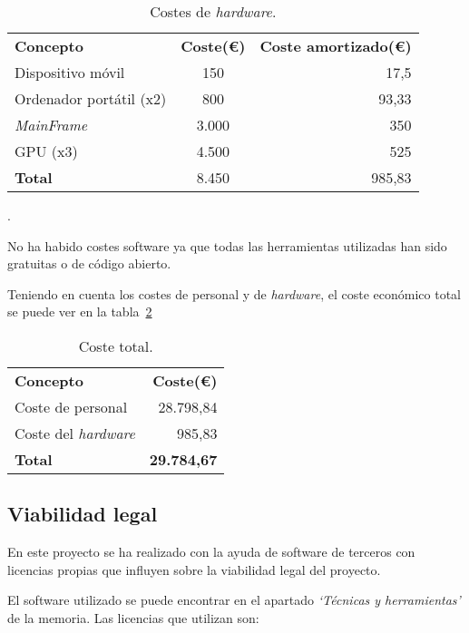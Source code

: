 \begin{table}
	\centering
	\begin{tabular}[]{@{}l c r@{}}
		\toprule
		\textbf{Concepto} & \textbf{Coste(\euro{})} & \textbf{Coste amortizado(\euro{})} \\
		Dispositivo móvil & 150 & 17,5 \\
		Ordenador portátil (x2) & 800 & 93,33 \\
		\textit{MainFrame} & 3.000 & 350 \\ 
		GPU (x3) & 4.500 & 525 \\\hubu
		\textbf{Total} & 8.450 & 985,83
	\end{tabular}
	\caption{Costes de \textit{hardware}.}
	\label{tab:costes_hardware}.
\end{table}

No ha habido costes software ya que todas las herramientas utilizadas han sido gratuitas o de código abierto.

Teniendo en cuenta los costes de personal y de \textit{hardware}, el coste económico total se puede ver en la tabla~\ref{tab:coste_total}

\begin{table}
	\centering
	\begin{tabular}[]{@{}l r@{}}
		\toprule
		\textbf{Concepto} & \textbf{Coste(\euro{})} \\
		Coste de personal & 28.798,84 \\ 
		Coste del \textit{hardware} & 985,83 \\\hubu
		\textbf{Total} & \textbf{29.784,67} \\		
	\end{tabular}
	\caption{Coste total.}
	\label{tab:coste_total}
\end{table}


\subsection{Viabilidad legal}

En este proyecto se ha realizado con la ayuda de software de terceros con licencias propias que influyen sobre la viabilidad legal del proyecto.

El software utilizado se puede encontrar en el apartado \textit{`Técnicas y herramientas'} de la memoria. Las licencias que utilizan son:

